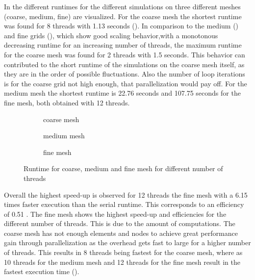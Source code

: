 In  the different runtimes for the different simulations on three different meshes (coarse, medium, fine) are visualized.
For the coarse mesh the shortest runtime was found for 8 threads with 1.13 seconds (). In comparison to the medium () and fine grids (), which show good scaling behavior,with a monotonous decreasing runtime for an increasing number of threads, the maximum runtime for the coarse mesh was found for 2 threads with 1.5 seconds. This behavior can contributed to the short runtime of the simulations on the coarse mesh itself, as they are in the order of possible fluctuations. Also the number of loop iterations is for the coarse grid not high enough, that parallelization would pay off. For the medium mesh the shortest runtime is 22.76 seconds and 107.75 seconds for the fine mesh, both obtained with 12 threads.
%
\begin{figure}[h!]
	\centering
	\begin{subfigure}{0.7\textwidth}
		\centering
		\resizebox{0.6\width}{!}{}
		\caption{\label{fig::Rcoarse} coarse mesh}
	\end{subfigure}
	\hfill
	\begin{subfigure}{0.7\textwidth}
		\centering
		\resizebox{0.6\width}{!}{}
		\caption{\label{fig::Rmedium} medium mesh}
	\end{subfigure}
	\hfill
	\begin{subfigure}{0.7\textwidth}
		\centering
		\resizebox{0.6\width}{!}{}
		\caption{\label{fig::Rfine} fine mesh}
	\end{subfigure}
	\caption{\label{fig::Runtime} Runtime for coarse, medium and fine mesh for different number of threads}
\end{figure}

\clearpage \noindent
Overall the highest speed-up is observed for 12 threads the fine mesh with a 6.15 times faster execution than the serial runtime. This corresponds to an efficiency of 0.51 . The fine mesh shows the highest speed-up and efficiencies for the different number of threads. This is due to the amount of computations. The coarse mesh has not enough elements and nodes to achieve great performance gain through parallelization as the overhead gets fast to large for a higher number of threads. This results in 8 threads being fastest for the coarse mesh, where as 10 threads for the medium mesh and 12 threads for the fine mesh result in the fastest execution time ().

